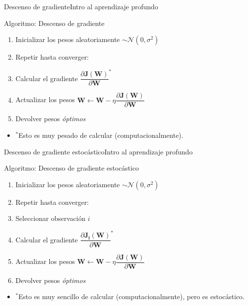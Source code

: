 \documentclass[10pt,border=3pt,tikz]{beamer}
\begin{document}
    \begin{frame}{Descenso de gradiente}{Intro al aprendizaje profundo}
        \begin{block}{Algoritmo: Descenso de gradiente}
            \begin{enumerate}
                \item Inicializar los pesos aleatoriamente $\sim \mathcal{N}(0,\sigma^2)$
                \item Repetir hasta converger:
                \item \hspace*{8pt} Calcular el gradiente \colorbox{yellow!20}{$\dfrac{\partial \mathbf{J(W)}}{\partial \mathbf{W}}^*$}
                \item \hspace*{8pt} Actualizar los pesos $\mathbf{W} \leftarrow \mathbf{W} - \eta \dfrac{\partial \mathbf{J(W)}}{\partial \mathbf{W}}$
                \item Devolver pesos \textit{óptimos}
            \end{enumerate}
        \end{block}
        \begin{itemize}
            \item $^*$Esto es muy pesado de calcular (computacionalmente).
        \end{itemize}
    \end{frame}
    
    \begin{frame}{Descenso de gradiente estocástico}{Intro al aprendizaje profundo}
        \begin{block}{Algoritmo: Descenso de gradiente estocástico}
            \begin{enumerate}
                \item Inicializar los pesos aleatoriamente $\sim \mathcal{N}(0,\sigma^2)$
                \item Repetir hasta converger:
                \item \hspace*{8pt} Seleccionar observación $i$
                \item \hspace*{8pt} Calcular el gradiente \colorbox{yellow!20}{$\dfrac{\partial \mathbf{J_i(W)}}{\partial \mathbf{W}}^*$}
                \item \hspace*{8pt} Actualizar los pesos $\mathbf{W} \leftarrow \mathbf{W} - \eta \dfrac{\partial \mathbf{J(W)}}{\partial \mathbf{W}}$
                \item Devolver pesos \textit{óptimos}
            \end{enumerate}
        \end{block}
        \begin{itemize}
            \item $^*$Esto es muy sencillo de calcular (computacionalmente), pero es estocástico.
        \end{itemize}
    \end{frame}
    
\end{document}
